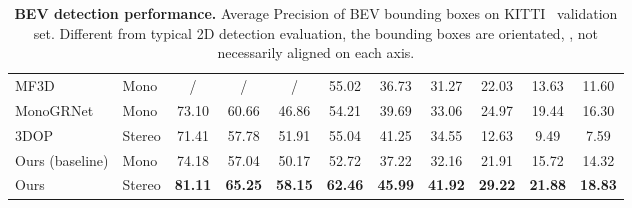 \begin{table*}[!htbp]
{\begin{spacing}{1.1}
{\begin{tabular}{|p{3cm}<{\centering}|p{1cm}<{\centering} ||ccc||ccc||ccc|}
					MF3D                    & Mono                                     & /                             & /                              & /                  & 55.02                     & 36.73                         & 31.27               & 22.03                     & 13.63                         & 11.60           \\ 
					MonoGRNet               & Mono                                                &73.10 &60.66 &46.86 &54.21 &39.69 &33.06 &24.97 &19.44 &16.30 \\
                    3DOP                    & Stereo                                       & 71.41                         &57.78                           &51.91               & 55.04                     & 41.25                         & 34.55               & 12.63                     & 9.49                          & 7.59           \\          
                    \hline
                    Ours (baseline)         & Mono                                   & 74.18                         & 57.04                          & 50.17              & 52.72                     & 37.22                         & 32.16               & 21.91                     & 15.72                          & 14.32 \\
                   
                    Ours                    & Stereo                                  & \textbf{81.11}                & \textbf{65.25}                 & \textbf{58.15}     & \textbf{62.46}            & \textbf{45.99}                & \textbf{41.92}      & \textbf{29.22}            & \textbf{21.88}                 & \textbf{18.83} \\ \hline
				\end{tabular}  
			} 
			\end{spacing}
     }
	\caption{\textbf{BEV detection performance.} Average Precision of BEV bounding boxes on KITTI~\cite{geiger2012kitti} validation set. Different from typical 2D detection evaluation, the bounding boxes are orientated, \ie, not necessarily aligned on each axis.
	}
	\label{tab:bvap} 
\end{table*}

